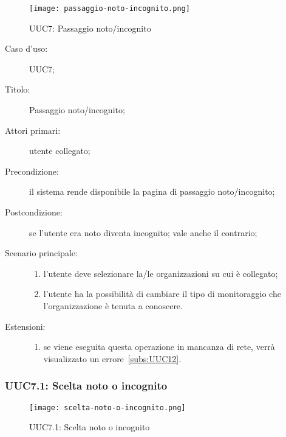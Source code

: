 \documentclass[../../../analisi-dei-requisiti.tex]{subfiles}
\begin{document}
\begin{figure}[H]
  \centering
  \texttt{[image: passaggio-noto-incognito.png]}
  \caption{UUC7: Passaggio noto/incognito}%
  \label{fig:uuc7}
\end{figure}

\begin{description}
  \item[Caso d’uso:] UUC7;
  \item[Titolo:] Passaggio noto/incognito;
  \item[Attori primari:] utente collegato;
  \item[Precondizione:] il sistema rende disponibile la pagina di passaggio noto/incognito;
  \item[Postcondizione:] se l'utente era noto diventa incognito; vale anche il contrario;
  \item[Scenario principale:]
        \begin{enumerate}
          \item l'utente deve selezionare la/le organizzazioni su cui è collegato;
          \item l'utente ha la possibilità di cambiare il tipo di monitoraggio che l'organizzazione è tenuta a conoscere.
        \end{enumerate}
  \item[Estensioni:]
        \begin{enumerate}
          \item se viene eseguita questa operazione in mancanza di rete, verrà visualizzato un errore~\ref{subs:UUC12}.
        \end{enumerate}
\end{description}

\subsubsection{UUC7.1: Scelta noto o incognito}%
\label{subs:UUC7.1}

\begin{figure}[H]
  \centering
  \texttt{[image: scelta-noto-o-incognito.png]}
  \caption{UUC7.1: Scelta noto o incognito}%
  \label{fig:uuc7_1}
\end{figure}
\end{document}
